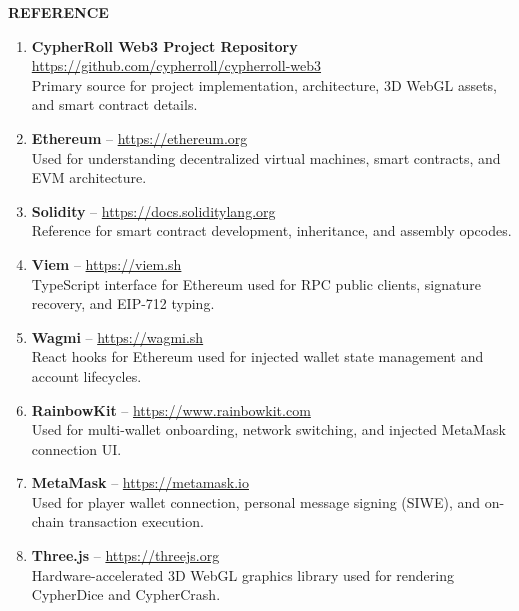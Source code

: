 \vspace*{0.5cm}
\begin{center}
\textbf{REFERENCE}
\end{center}
\label{chap:reference}
\vspace{0.2cm}

\begin{enumerate}[leftmargin=1.8em,itemsep=0.8em]
    \item \textbf{CypherRoll Web3 Project Repository} \\
    \url{https://github.com/cypherroll/cypherroll-web3} \\
    Primary source for project implementation, architecture, 3D WebGL assets, and smart contract details.

    \item \textbf{Ethereum} -- \url{https://ethereum.org} \\
    Used for understanding decentralized virtual machines, smart contracts, and EVM architecture.

    \item \textbf{Solidity} -- \url{https://docs.soliditylang.org} \\
    Reference for smart contract development, inheritance, and assembly opcodes.

    \item \textbf{Viem} -- \url{https://viem.sh} \\
    TypeScript interface for Ethereum used for RPC public clients, signature recovery, and EIP-712 typing.

    \item \textbf{Wagmi} -- \url{https://wagmi.sh} \\
    React hooks for Ethereum used for injected wallet state management and account lifecycles.

    \item \textbf{RainbowKit} -- \url{https://www.rainbowkit.com} \\
    Used for multi-wallet onboarding, network switching, and injected MetaMask connection UI.

    \item \textbf{MetaMask} -- \url{https://metamask.io} \\
    Used for player wallet connection, personal message signing (SIWE), and on-chain transaction execution.

    \item \textbf{Three.js} -- \url{https://threejs.org} \\
    Hardware-accelerated 3D WebGL graphics library used for rendering CypherDice and CypherCrash.


\end{enumerate}
